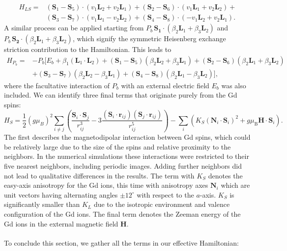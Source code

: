 \begin{align}
    H_{LS} =& (\bm{S}_1 - \bm{S}_5) \cdot (v_1 \bm{L}_2 + v_2 \bm{L}_1) + (\bm{S}_2 - \bm{S}_6) \cdot (v_1 \bm{L}_1 + v_2 \bm{L}_2) + \nonumber \\ &(\bm{S}_3 - \bm{S}_7) \cdot (v_1 \bm{L}_1 - v_2 \bm{L}_2) + (\bm{S}_4 - \bm{S}_8) \cdot (-v_1 \bm{L}_2 + v_2 \bm{L}_1).
\end{align}
A similar process can be applied starting from $P_b \, \bm{S_1}\cdot(\beta_2 \bm{L}_1 + \beta_3 \bm{L}_2)$ and $P_b\, \bm{S_2}\cdot(\beta_2 \bm{L}_1 + \beta_3 \bm{L}_2)$, which signify the symmetric Heisenberg exchange striction contribution to the Hamiltonian. This leads to
\begin{align}
	H_{P_b}=&-P_b[E_b + \beta_1 (\bm{L}_1\cdot \bm{L}_2)+
    (\bm{S}_1-\bm{S}_5)(\beta_2 \bm{L}_2 + \beta_3 \bm{L}_1) +
    (\bm{S}_2-\bm{S}_6)(\beta_2 \bm{L}_1 + \beta_3 \bm{L}_2) \nonumber\\ 
    &+(\bm{S}_3-\bm{S}_7)(\beta_2 \bm{L}_2 - \beta_3 \bm{L}_1) +
    (\bm{S}_4-\bm{S}_8)(\beta_2 \bm{L}_1 - \beta_3 \bm{L}_2)],
\end{align}
where the facultative interaction of $P_b$ with an external electric field $E_b$ was also included. 
We can identify three final terms that originate purely from the Gd spins:
\begin{equation}
     H_S=\frac{1}{2}(g \mu_B)^2\sum_{i\neq j}\left(\frac{\bm{S}_i\cdot \bm{S}_j}{r_{ij}^3}-3\frac{(\bm{S}_i\cdot \bm{r}_{ij})(\bm{S}_j\cdot \bm{r}_{ij})}{r_{ij}^5}\right) - \sum_i\left( K_S(\bm{N}_i\cdot \bm{S}_i)^2 + g\mu_\mathrm{B} \bm{H} \cdot \bm{S}_i\right). 
\end{equation}
The first describes the magnetodipolar interaction between Gd spins, which could be relatively large due to the size of the spins and relative proximity to the neighbors.
In the numerical simulations these interactions were restricted to their five nearest neighbors, including periodic images.
Adding further neighbors did not lead to qualitative differences in the results.
The term with $K_S$ denotes the easy-axis anisotropy for the Gd ions, this time with anisotropy axes $\bm{N}_i$ which are unit vectors having alternating angles $\pm 12^\circ$ with respect to the $a$-axis.
$K_S$ is significantly smaller than $K_L$ due to the isotropic environment and valence configuration of the Gd ions.
The final term denotes the Zeeman energy of the Gd ions in the external magnetic field $\bm{H}$.
\\\\
To conclude this section, we gather all the terms in our effective Hamiltonian:
